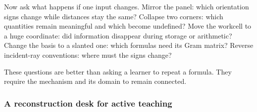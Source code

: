 Now ask what happens if one input changes. Mirror the panel: which orientation signs change while distances stay the same? Collapse two corners: which quantities remain meaningful and which become undefined? Move the workcell to a huge coordinate: did information disappear during storage or arithmetic? Change the basis to a slanted one: which formulas need its Gram matrix? Reverse incident-ray conventions: where must the signs change?

These questions are better than asking a learner to repeat a formula. They require the mechanism and its domain to remain connected.

\subsubsection{A reconstruction desk for active teaching}\label{a-reconstruction-desk-for-active-teaching}

